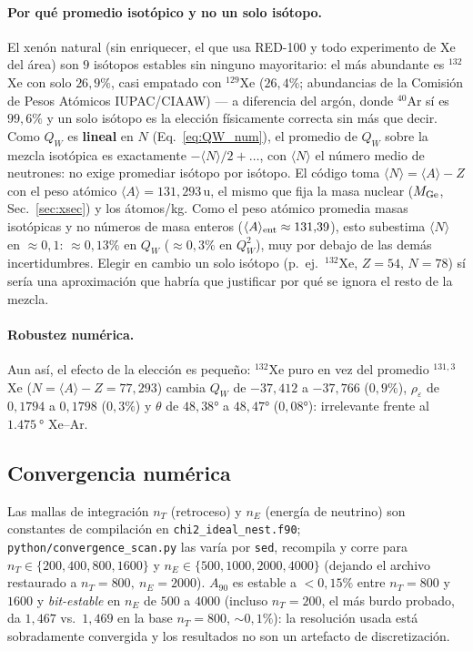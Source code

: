 \documentclass[11pt,a4paper]{article}
\newcommand{\eps}{\varepsilon}
\newcommand{\QW}{Q_{W}}
\newcommand{\code}[1]{\texttt{#1}}
\begin{document}
\paragraph{Por qu\'e promedio isot\'opico y no un solo is\'otopo.} El xen\'on
natural (sin enriquecer, el que usa RED-100 y todo experimento de Xe del \'area)
son $9$ is\'otopos estables sin ninguno mayoritario: el m\'as abundante es
$^{132}$Xe con solo $26{,}9\%$, casi empatado con $^{129}$Xe ($26{,}4\%$;
abundancias de la Comisi\'on de Pesos At\'omicos IUPAC/CIAAW) --- a diferencia
del arg\'on, donde $^{40}$Ar s\'i es
$99{,}6\%$ y un solo is\'otopo es la elecci\'on f\'isicamente correcta sin m\'as
que decir. Como $\QW$ es \textbf{lineal} en $N$
(Eq.~\eqref{eq:QW_num}), el promedio de $\QW$ sobre la mezcla isot\'opica es
exactamente $-\langle N\rangle/2+\ldots$, con $\langle N\rangle$ el n\'umero medio
de neutrones: no exige promediar is\'otopo por is\'otopo. El c\'odigo toma
$\langle N\rangle=\langle A\rangle-Z$ con el peso at\'omico
$\langle A\rangle=131{,}293\,$u, el mismo que fija la masa nuclear ($M_{\rm Ge}$,
Sec.~\ref{sec:xsec}) y los \'atomos/kg. Como el peso at\'omico promedia masas
isot\'opicas y no n\'umeros de masa enteros ($\langle A\rangle_{\rm ent}\approx
131{,}39$), esto subestima $\langle N\rangle$ en $\approx0{,}1$: $\approx0{,}13\%$
en $\QW$ ($\approx0{,}3\%$ en $\QW^{2}$), muy por debajo de las dem\'as
incertidumbres. Elegir en cambio un solo
is\'otopo (p.\ ej.\ $^{132}$Xe, $Z=54$, $N=78$) s\'i ser\'ia una aproximaci\'on
que habr\'ia que justificar por qu\'e se ignora el resto de la mezcla.

\paragraph{Robustez num\'erica.} Aun as\'i, el efecto de la elecci\'on es
peque\~no: $^{132}$Xe puro en vez del promedio $^{131{,}3}$Xe
($N=\langle A\rangle-Z=77{,}293$) cambia $\QW$ de $-37{,}412$ a $-37{,}766$
($0{,}9\%$), $\rho_{\eps}$ de $0{,}1794$ a $0{,}1798$ ($0{,}3\%$) y $\theta$ de
$48{,}38\si{\degree}$ a $48{,}47\si{\degree}$ ($0{,}08\si{\degree}$):
irrelevante frente al $\SI{1.475}{\degree}$ Xe--Ar.

\subsection{Convergencia num\'erica}
\label{sec:convergencia}

Las mallas de integraci\'on $n_{T}$ (retroceso) y $n_{E}$ (energ\'ia de neutrino)
son constantes de compilaci\'on en \code{chi2\_ideal\_nest.f90};
\code{python/convergence\_scan.py} las var\'ia por \code{sed}, recompila y corre
para $n_{T}\in\{200,400,800,1600\}$ y $n_{E}\in\{500,1000,2000,4000\}$ (dejando el
archivo restaurado a $n_{T}=800,\ n_{E}=2000$). $A_{90}$ es estable a $<0{,}15\%$
entre $n_{T}=800$ y $1600$ y \emph{bit-estable} en $n_{E}$ de $500$ a $4000$
(incluso $n_{T}=200$, el m\'as burdo probado, da $1{,}467$ vs.\ $1{,}469$ en la
base $n_T=800$, $\sim0{,}1\%$): la resoluci\'on usada est\'a sobradamente
convergida y los resultados no son un artefacto de discretizaci\'on.
\end{document}
